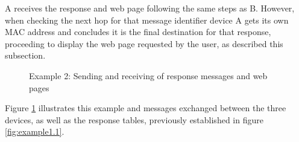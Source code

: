 A receives the response and web page following the same steps as B. However, when checking the next hop for that message identifier device A gets its own \gls{MAC} address and concludes it is the final destination for that response, proceeding to display the web page requested by the user, as described this subsection.

\begin{figure}[ht]
   \noindent{}
	\caption{\label{fig:example1.2} Example 2: Sending and receiving of response messages and web pages}
\end{figure}

Figure \ref{fig:example1.2} illustrates this example and messages exchanged between the three devices, as well as the response tables, previously established in figure \ref{fig:example1.1}.











